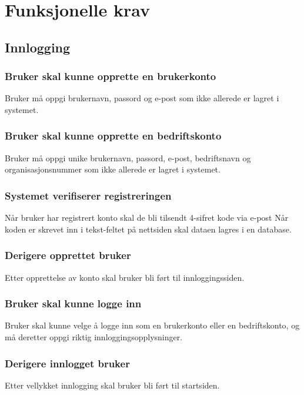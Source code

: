 \documentclass[12pt]{article}
\begin{document}
\section{Funksjonelle krav}

\subsection{Innlogging}

\subsubsection{Bruker skal kunne opprette en brukerkonto}
Bruker må oppgi brukernavn, passord og e-post som ikke allerede er lagret i systemet.

\subsubsection{Bruker skal kunne opprette en bedriftskonto}
Bruker må oppgi unike brukernavn, passord, e-post, bedriftsnavn og organisasjonsnummer som ikke allerede er lagret i systemet.

\subsubsection{Systemet verifiserer registreringen}
Når bruker har registrert konto skal de bli tilsendt 4-sifret kode via e-post Når koden er skrevet inn i tekst-feltet på nettsiden skal dataen lagres i en database.

\subsubsection{Derigere opprettet bruker}
Etter opprettelse av konto skal bruker bli ført til innloggingssiden.

\subsubsection{Bruker skal kunne logge inn}
Bruker skal kunne velge å logge inn som en brukerkonto eller en bedriftskonto, og må deretter oppgi riktig innloggingsopplysninger.

\subsubsection{Derigere innlogget bruker}
Etter vellykket innlogging skal bruker bli ført til startsiden.
\end{document}
